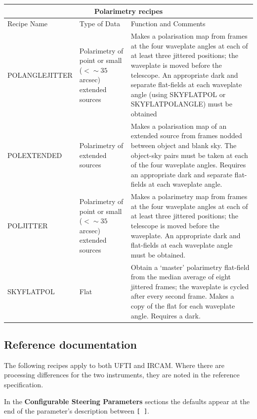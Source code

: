 \documentclass[twoside,11pt]{article}
\newcommand{\htmlref}[2]{#1}
\renewcommand{\_}{\texttt{\symbol{95}}}
\begin{document}
\begin{center}
\begin{tabular}{|l|p{29mm}|p{77mm}|}
\multicolumn{3}{c}{\large{\bf Polarimetry recipes}} \vspace*{1ex} \\
\hline
Recipe Name & Type of Data & Function and Comments \\ \hline
\htmlref{POL\_ANGLE\_JITTER}{POL\_ANGLE\_JITTER} & 
   Polarimetry of point or small ($<\sim35$ arcsec) extended sources &
   Makes a polarisation map from frames at the four waveplate angles at
   each of at least three jittered positions; the waveplate is moved
   before the telescope.  An appropriate dark and separate flat-fields
   at each waveplate angle (using SKY\_FLAT\_POL or SKY\_FLAT\_POL\_ANGLE)
   must be obtained \\ \hline
\htmlref{POL\_EXTENDED}{POL\_EXTENDED} &
   Polarimetry of extended sources &
   Makes a polarisation map of an extended source from frames
   nodded between object and blank sky.  The object-sky pairs
   must be taken at each of the four waveplate angles.  Requires
   an appropriate dark and separate flat-fields at each waveplate
   angle.\\ \hline
\htmlref{POL\_JITTER}{POL\_JITTER} & 
   Polarimetry of point or small ($<\sim35$ arcsec) extended sources &
   Makes a polarimetry map from frames at the four waveplate angles at
   each of at least three jittered positions; the telescope is moved
   before the waveplate.  An appropriate dark and flat-fields at each
   waveplate angle must be obtained.\\ \hline
\htmlref{SKY\_FLAT\_POL}{SKY\_FLAT\_POL} & Flat &
   Obtain a `master' polarimetry flat-field from the median average
   of eight jittered frames; the waveplate is cycled after
   every second frame.  Makes a copy of the flat for each
   waveplate angle.  Requires a dark.\\ \hline
\end{tabular}
\end{center}

\newpage
\subsection{Reference documentation}

The following recipes apply to both UFTI and IRCAM.  Where there are
processing differences for the two instruments, they are noted in
the reference specification.

In the {\bf Configurable Steering Parameters} sections the defaults
appear at the end of the parameter's description between {\tt [~]}.
\end{document}

